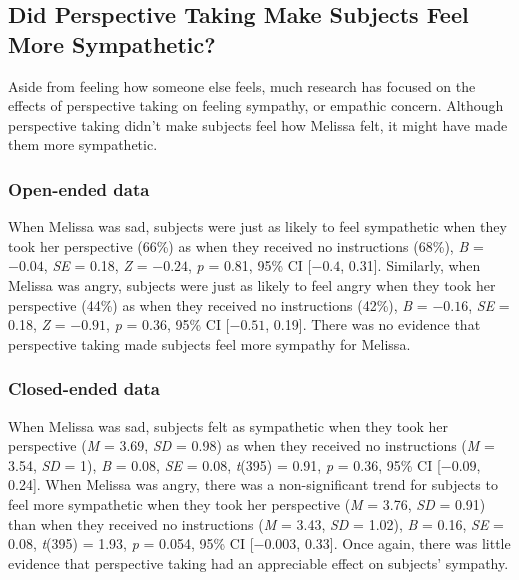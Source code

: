 \documentclass[man,a4paper,noextraspace,apacite]{apa6}\usepackage[]{graphicx}\usepackage[]{color}
\begin{document}
\subsection{Did Perspective Taking Make Subjects Feel More Sympathetic?}

Aside from feeling how someone else feels, much research has focused on the effects of perspective taking on feeling sympathy, or empathic concern. Although perspective taking didn't make subjects feel how Melissa felt, it might have made them more sympathetic.

\subsubsection{Open-ended data}


When Melissa was sad, subjects were just as likely to feel sympathetic when they took her perspective (66\%) as when they received no instructions (68\%), \textit{B} = \ensuremath{-0.04}, \textit{SE} = 0.18, \textit{Z} = \ensuremath{-0.24}, \textit{p} = 0.81, 95\% CI [\ensuremath{-0.4}, 0.31]. Similarly, when Melissa was angry, subjects were just as likely to feel angry when they took her perspective (44\%) as when they received no instructions (42\%), \textit{B} = \ensuremath{-0.16}, \textit{SE} = 0.18, \textit{Z} = \ensuremath{-0.91}, \textit{p} = 0.36, 95\% CI [\ensuremath{-0.51}, 0.19]. There was no evidence that perspective taking made subjects feel more sympathy for Melissa.

\subsubsection{Closed-ended data}



When Melissa was sad, subjects felt as sympathetic when they took her perspective (\textit{M} = 3.69, \textit{SD} = 0.98) as when they received no instructions (\textit{M} = 3.54, \textit{SD} = 1), \textit{B} = 0.08, \textit{SE} = 0.08, \textit{t}(395) = 0.91, \textit{p} = 0.36, 95\% CI [\ensuremath{-0.09}, 0.24]. When Melissa was angry, there was a non-significant trend for subjects to feel more sympathetic when they took her perspective (\textit{M} = 3.76, \textit{SD} = 0.91) than when they received no instructions (\textit{M} = 3.43, \textit{SD} = 1.02), \textit{B} = 0.16, \textit{SE} = 0.08, \textit{t}(395) = 1.93, \textit{p} = 0.054, 95\% CI [\ensuremath{-0.003}, 0.33]. Once again, there was little evidence that perspective taking had an appreciable effect on subjects' sympathy. 
\end{document}
